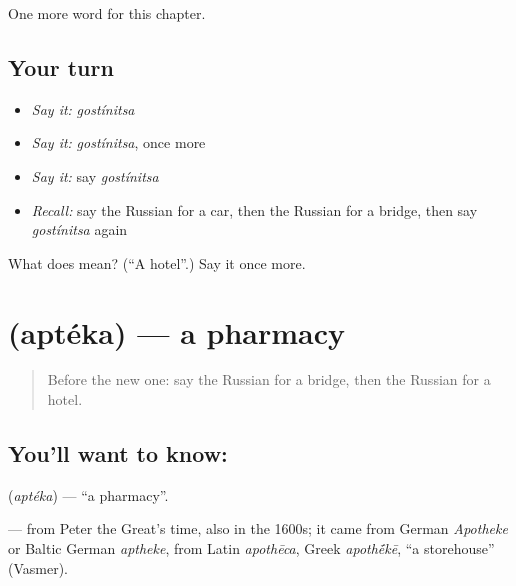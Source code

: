 \begin{grammarlens}[title={What you've built}]
One more word for this chapter.
\end{grammarlens}

\subsection*{Your turn}
\begin{itemize}
\raggedright
  \item \emph{Say it:} \emph{gostínitsa}
  \item \emph{Say it:} \emph{gostínitsa}, once more
  \item \emph{Say it:} say \emph{gostínitsa}
  \item \emph{Recall:} say the Russian for a car, then the Russian for a bridge, then say \emph{gostínitsa} again
\end{itemize}

\begin{tcolorbox}[breakable,colback=teal!4,colframe=teal!35!black,title={Before you move on}]
What does  mean? (\textquotedblleft{}A hotel\textquotedblright{}.) Say it once more.
\end{tcolorbox}
\section[\texorpdfstring{\ru{аптека} (aptéka)}{аптека (aptéka)}]{ (aptéka) — a pharmacy}

\label{lesson:RU-C80-pharmacy}



\begin{quote}
Before the new one: say the Russian for a bridge, then the Russian for a hotel.
\end{quote}

\subsection*{You'll want to know: }
\textbf{} (\emph{aptéka}) — \textquotedblleft{}a pharmacy\textquotedblright{}.

\begin{cousinweb}
\textbf{} — from Peter the Great's time, also \emph{} in the 1600s; it came from German \emph{Apotheke} or Baltic German \emph{aptheke}, from Latin \emph{apothēca}, Greek \emph{apoth\'{\={e}}kē}, \textquotedblleft{}a storehouse\textquotedblright{} (Vasmer).
\end{cousinweb}


